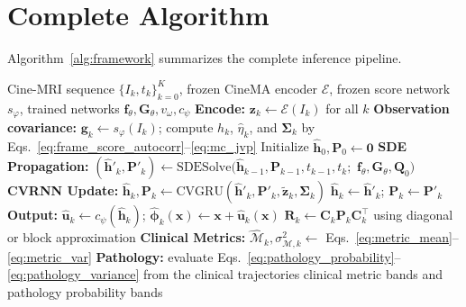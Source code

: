 \documentclass[10pt,twocolumn]{article}
\begin{document}
\section{Complete Algorithm}
\label{sec:algorithm}

Algorithm~\ref{alg:framework} summarizes the complete inference pipeline.

\begin{algorithm}[t]
\caption{Uncertainty-Aware Cardiac Assessment}
\label{alg:framework}
\begin{algorithmic}[1]
\REQUIRE Cine-MRI sequence $\{I_k, t_k\}_{k=0}^{K}$, frozen CineMA encoder $\mathcal{E}$, frozen score network $s_{\varphi}$, trained networks $\bm{f}_\theta, \bm{G}_\theta, v_\omega, c_\psi$
\STATE \textbf{Encode:} $\bm{z}_k \gets \mathcal{E}(I_k)$ for all $k$
\STATE \textbf{Observation covariance:} $\bm{g}_k\gets s_{\varphi}(I_k)$; compute $h_k$, $\hat{\eta}_k$, and $\bm{\Sigma}_k$ by Eqs.~\eqref{eq:frame_score_autocorr}--\eqref{eq:mc_jvp}
\STATE Initialize $\hat{\bm{h}}_0, \bm{P}_0 \gets \bm{0}$
    \STATE \textbf{SDE Propagation:}
    \STATE $(\hat{\bm{h}}'_k, \bm{P}'_k) \gets \text{SDESolve}(\hat{\bm{h}}_{k-1}, \bm{P}_{k-1}, t_{k-1}, t_k;$
    \STATE \hspace{\algorithmicindent}$\bm{f}_\theta, \bm{G}_\theta, \bm{Q}_0)$
        \STATE \textbf{CVRNN Update:}
        \STATE $\hat{\bm{h}}_k, \bm{P}_k \gets \text{CVGRU}(\hat{\bm{h}}'_k, \bm{P}'_k, \tilde{\bm{z}}_k, \bm{\Sigma}_k)$
    \ELSE
        \STATE $\hat{\bm{h}}_k \gets \hat{\bm{h}}'_k$; $\bm{P}_k \gets \bm{P}'_k$
    \ENDIF
    \STATE \textbf{Output:}
    \STATE $\hat{\bm{u}}_k \gets c_\psi(\hat{\bm{h}}_k)$; $\hat{\bm{\phi}}_k(\bm{x}) \gets \bm{x}+\hat{\bm{u}}_k(\bm{x})$
    \STATE $\bm{R}_k \gets \bm{C}_k\bm{P}_k\bm{C}_k^\top$ using diagonal or block approximation
    \STATE \textbf{Clinical Metrics:}
    \STATE $\hat{\mathcal{M}}_k, \sigma^2_{\mathcal{M},k} \gets$ Eqs.~\eqref{eq:metric_mean}--\eqref{eq:metric_var}
\ENDFOR
\STATE \textbf{Pathology:} evaluate Eqs.~\eqref{eq:pathology_probability}--\eqref{eq:pathology_variance} from the clinical trajectories
\RETURN clinical metric bands and pathology probability bands
\end{algorithmic}
\end{algorithm}

\end{document}
